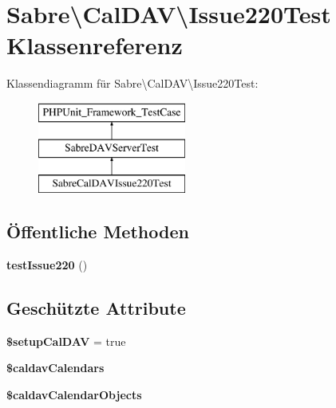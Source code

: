 \hypertarget{class_sabre_1_1_cal_d_a_v_1_1_issue220_test}{}\section{Sabre\textbackslash{}Cal\+D\+AV\textbackslash{}Issue220\+Test Klassenreferenz}
\label{class_sabre_1_1_cal_d_a_v_1_1_issue220_test}
Klassendiagramm für Sabre\textbackslash{}Cal\+D\+AV\textbackslash{}Issue220\+Test\+:\begin{figure}[H]
\begin{center}
\leavevmode
\includegraphics[height=3.000000cm]{class_sabre_1_1_cal_d_a_v_1_1_issue220_test}
\end{center}
\end{figure}
\subsection*{Öffentliche Methoden}
\begin{DoxyCompactItemize}
\item 
\mbox{\label{class_sabre_1_1_cal_d_a_v_1_1_issue220_test_a2466554457442c127fcad93992236662}} 
{\bfseries test\+Issue220} ()
\end{DoxyCompactItemize}
\subsection*{Geschützte Attribute}
\begin{DoxyCompactItemize}
\item 
\mbox{\label{class_sabre_1_1_cal_d_a_v_1_1_issue220_test_af885cc82a97fbc124dddb625090e3f26}} 
{\bfseries \$setup\+Cal\+D\+AV} = true
\item 
{\bfseries \$caldav\+Calendars}
\item 
\mbox{\label{class_sabre_1_1_cal_d_a_v_1_1_issue220_test_a68ff3baaf98699050c6cee91aa12a958}} 
{\bfseries \$caldav\+Calendar\+Objects}
\end{DoxyCompactItemize}


